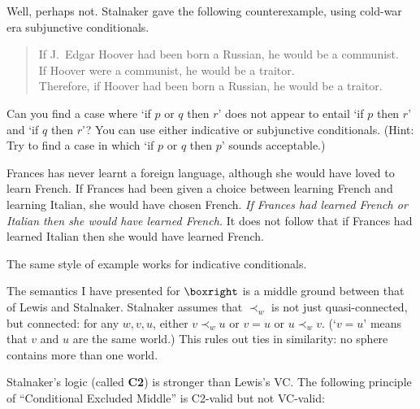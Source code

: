 Well, perhaps not. Stalnaker gave the following counterexample, using cold-war
era subjunctive conditionals.
\begin{quote}
  If J.\ Edgar Hoover had been born a Russian, he would be a communist.\\
  If Hoover were a communist, he would be a traitor.\\
  Therefore, if Hoover had been born a Russian, he would be a traitor.
\end{quote}

\begin{exercise}
  Can you find a case where `if $p$ or $q$ then $r$' does not appear to entail
  `if $p$ then $r$' and `if $q$ then $r$'? You can use either indicative or
  subjunctive conditionals. (Hint: Try to find a case in which `if $p$ or $q$
  then $p$' sounds acceptable.)
\end{exercise}
\begin{solution}
  Frances has never learnt a foreign language, although she would have loved to
  learn French. If Frances had been given a choice between learning French and
  learning Italian, she would have chosen French. \emph{If Frances had learned
    French or Italian then she would have learned French.} It does not follow that
  if Frances had learned Italian then she would have learned French.

  The same style of example works for indicative conditionals.
\end{solution}


The semantics I have presented for $\boxright$ is a middle ground between that
of Lewis and Stalnaker. Stalnaker assumes that $\prec_w$ is not just
quasi-connected, but connected: for any $w,v,u$, either $v \prec_w u$ or $v=u$
or $u \prec_w v$. (`$v=u$' means that $v$ and $u$ are the same world.) This
rules out ties in similarity: no sphere contains more than one world.

Stalnaker's logic (called \textbf{C2}) is stronger than Lewis's VC. The
following principle of ``Conditional Excluded Middle'' is C2-valid but not VC-valid:
%


